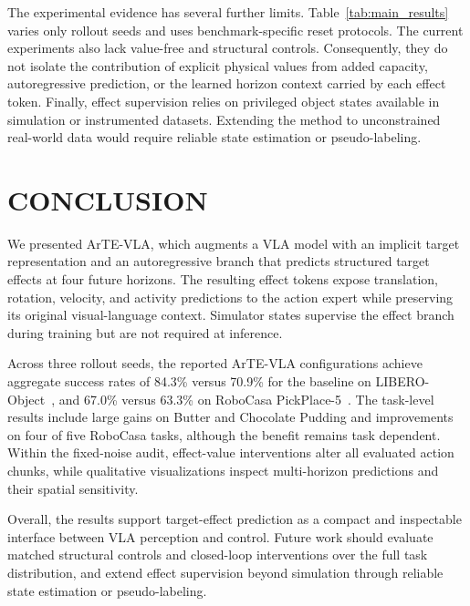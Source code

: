 \documentclass[letterpaper,10pt,conference]{ieeeconf}
\newcommand{\method}{ArTE-VLA}
\begin{document}
The experimental evidence has several further limits.
Table~\ref{tab:main_results} varies only rollout seeds and uses benchmark-specific reset protocols.
The current experiments also lack value-free and structural controls.
Consequently, they do not isolate the contribution of explicit physical values from added capacity, autoregressive prediction, or the learned horizon context carried by each effect token.
Finally, effect supervision relies on privileged object states available in simulation or instrumented datasets.
Extending the method to unconstrained real-world data would require reliable state estimation or pseudo-labeling.

\FloatBarrier
\section{CONCLUSION}
\label{sec:conclusion}

We presented \method{}, which augments a VLA model with an implicit target representation and an autoregressive branch that predicts structured target effects at four future horizons.
The resulting effect tokens expose translation, rotation, velocity, and activity predictions to the action expert while preserving its original visual-language context.
Simulator states supervise the effect branch during training but are not required at inference.

Across three rollout seeds, the reported \method{} configurations achieve aggregate success rates of 84.3\% versus 70.9\% for the baseline on LIBERO-Object~\cite{libero}, and 67.0\% versus 63.3\% on RoboCasa PickPlace-5~\cite{robocasa2024}.
The task-level results include large gains on Butter and Chocolate Pudding and improvements on four of five RoboCasa tasks, although the benefit remains task dependent.
Within the fixed-noise audit, effect-value interventions alter all evaluated action chunks, while qualitative visualizations inspect multi-horizon predictions and their spatial sensitivity.

Overall, the results support target-effect prediction as a compact and inspectable interface between VLA perception and control.
Future work should evaluate matched structural controls and closed-loop interventions over the full task distribution, and extend effect supervision beyond simulation through reliable state estimation or pseudo-labeling.



\end{document}
